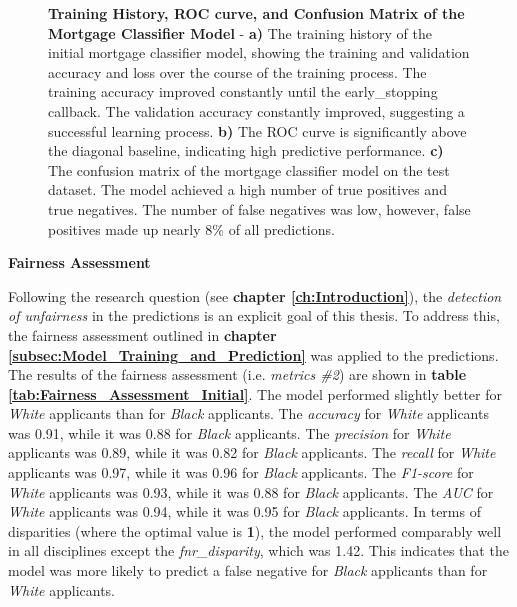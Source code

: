 \begin{figure}[!htbp]
    \caption[Training History, ROC curve, and Confusion Matrix of the Mortgage Classifier Model]{\textbf{Training History, ROC curve, and Confusion Matrix of the Mortgage Classifier Model} - \textbf{a)} The training history of the initial mortgage classifier model, showing the training and validation accuracy and loss over the course of the training process. 
    The training accuracy improved constantly until the early\_stopping callback. The validation accuracy constantly improved, suggesting a successful learning process.
    \textbf{b)} The ROC curve is significantly above the diagonal baseline, indicating high predictive performance. 
    \textbf{c)} The confusion matrix of the mortgage classifier model on the test dataset. The model achieved a high number of true positives and true negatives. The number of false negatives was low, however, false positives made up nearly 8\% of all predictions.}

    \label{fig:Model_Training_Results_Panel}

\end{figure}

\textbf{Fairness Assessment}

Following the research question (see \textbf{chapter \ref{ch:Introduction}}), the \textit{detection of unfairness} in the predictions is an explicit goal of this thesis. To address this, the fairness assessment outlined in \textbf{chapter \ref{subsec:Model_Training_and_Prediction}} was applied to the predictions. The results of the fairness assessment (i.e. \textit{metrics \#2}) are shown in \textbf{table \ref{tab:Fairness_Assessment_Initial}}. 
The model performed slightly better for \textit{White} applicants than for \textit{Black} applicants. The \textit{accuracy} for \textit{White} applicants was 0.91, while it was 0.88 for \textit{Black} applicants. The \textit{precision} for \textit{White} applicants was 0.89, while it was 0.82 for \textit{Black} applicants. The \textit{recall} for \textit{White} applicants was 0.97, while it was 0.96 for \textit{Black} applicants. 
The \textit{F1-score} for \textit{White} applicants was 0.93, while it was 0.88 for \textit{Black} applicants. The \textit{AUC} for \textit{White} applicants was 0.94, while it was 0.95 for \textit{Black} applicants. 
In terms of disparities (where the optimal value is \textbf{1}), the model performed comparably well in all disciplines except the \textit{fnr\_disparity}, which was 1.42. This indicates that the model was more likely to predict a false negative for \textit{Black} applicants than for \textit{White} applicants.

